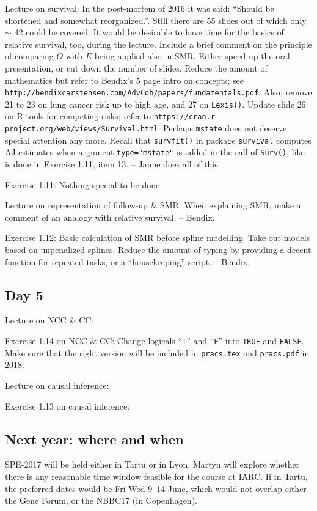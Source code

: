 Lecture on survival: In the post-mortem of 2016 it was said: 
``Should be shortened and somewhat reorganized.''. 
Still there are 55 slides out of which only $\sim$ 42 could be covered. 
It would be desirable to have time for the basics of relative survival, too,
during the lecture. Include a brief comment on the principle of
comparing $O$ with $E$ being applied also in SMR.
Either speed up the oral presentation, or cut down the number of slides.
Reduce the amount of mathematics but refer to Bendix's 5 page intro
on concepts; see \verb|http://bendixcarstensen.com/AdvCoh/papers/fundamentals.pdf|.
Also, remove 21 to 23 on lung cancer risk up to high age, and 27 on {\tt Lexis()}.
Update slide 26 on R tools for competing risks; refer
to \verb|https://cran.r-project.org/web/views/Survival.html|.
 Perhaps {\tt mstate} does not deserve special attention any more.
Recall that {\tt survfit()} 
in package {\tt survival} computes AJ-estimates when argument {\tt type="mstate"}
is added in the call of {\tt Surv()}, like is done in Exercise 1.11, item 13.
-- Janne does all of this.

Exercise 1.11: Nothing special to be done. 

Lecture on representation of follow-up \& SMR: When explaining SMR, make a comment
of an analogy with relative survival. -- Bendix. 

Exercise 1.12: Basic calculation of SMR before spline modelling.
Take out models based on unpenalized splines.
 Reduce the amount of typing by providing a decent function
for repeated tasks, or a ``housekeeping'' script. -- Bendix.  

\subsection*{Day 5}

Lecture on NCC \& CC: 

Exercise 1.14 on NCC \& CC: Change logicals ``{\tt T}'' and ``{\tt F}'' into
{\tt TRUE} and {\tt FALSE}. Make sure that the right version will be included in {\tt pracs.tex} and {\tt pracs.pdf} in 2018.

Lecture on causal inference:

Exercise 1.13 on causal inference:



\subsection*{Next year: where and when}
SPE-2017 will be held either in Tartu or in Lyon. Martyn will explore whether there is any 
reasonable time window feasible for the course at IARC.
If in Tartu, the preferred dates would be Fri-Wed 9--14 June, 
which would not overlap either the Gene Forum, or the NBBC17 (in Copenhagen).

